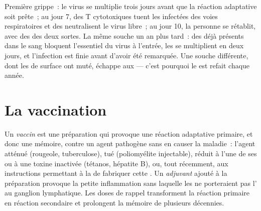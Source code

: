 \begin{example}\label{ex:g12:adaptive-immunity:virus}
Première grippe~: le virus se multiplie trois jours avant que la
réaction adaptative soit prête~; au jour 7, des  T
cytotoxiques tuent les  infectées des voies respiratoires et
des  neutralisent le virus libre~; au jour 10, la personne se
rétablit, avec des  des deux sortes. La même souche un
an plus tard~: des  déjà présents dans le sang bloquent
l'essentiel du virus à l'entrée, les  se multiplient
en deux jours, et l'infection est finie avant d'avoir été remarquée.
Une souche différente, dont les  de surface ont muté, échappe
aux  --- c'est pourquoi le  est refait chaque année.
\end{example}

\section{La vaccination}

\begin{definition}[Vaccin]\label{def:g12:adaptive-immunity:vaccine}
Un \emph{vaccin} est une préparation qui provoque une
réaction adaptative primaire, et donc une mémoire, contre un agent
pathogène sans en causer la maladie~: l'agent atténué (rougeole,
tuberculose), tué (poliomyélite injectable), réduit à l'une de ses
 ou à une toxine inactivée (tétanos, hépatite B), ou, tout
récemment, aux instructions permettant à la  de fabriquer cette
. Un \emph{adjuvant} ajouté à la préparation provoque la
petite inflammation sans laquelle les  ne
porteraient pas l' au ganglion lymphatique. Les doses de
rappel transforment la réaction primaire en réaction secondaire et
prolongent la mémoire de plusieurs décennies.
\end{definition}

